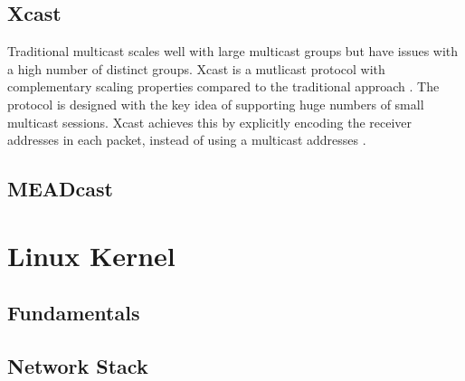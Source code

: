 \subsection{Xcast}
\label{sub:Xcast}
Traditional multicast scales well with large multicast groups but have issues
with a high number of distinct groups.
Xcast is a mutlicast protocol with complementary scaling properties compared to
the traditional approach \cite{xcast_rfc}.
The protocol is designed with the key idea of supporting huge numbers of small
multicast sessions.
Xcast achieves this by explicitly encoding the receiver addresses in each
packet, instead of using a multicast addresses \cite{xcast_rfc}.





\subsection{MEADcast} %
\label{sub:MEADcast}


\section{Linux Kernel} %
\label{sec:Linux Kernel}

\subsection{Fundamentals} %
\label{sub:Fundamentals}


\subsection{Network Stack} %
\label{sub:Network Stack}


